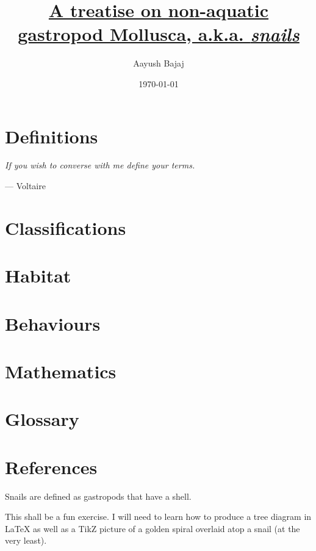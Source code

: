 \documentclass[10pt]{article}
\begin{document}
\title{\underline{A treatise on non-aquatic gastropod Mollusca, a.k.a. \emph{snails}}}
\author{Aayush Bajaj}
\date{\today}
\maketitle

\tableofcontents

\dotfill
\bigbreak

\section*{Definitions}

\begin{flushright}
\begin{minipage}{8cm}
    \begin{flushleft} \emph{If you wish to converse with me define your terms.} \end{flushleft}
    \begin{flushright}--- Voltaire\end{flushright}
\end{minipage}
\end{flushright}

\section*{Classifications}
\section*{Habitat}
\section*{Behaviours}
\section*{Mathematics}
\section*{Glossary}
\section*{References}



Snails are defined as gastropods that have a shell. 

This shall be a fun exercise. I will need to learn how to produce a tree diagram in \LaTeX{} as well as a TikZ picture of a golden spiral overlaid atop a snail (at the very least).
\end{document}
